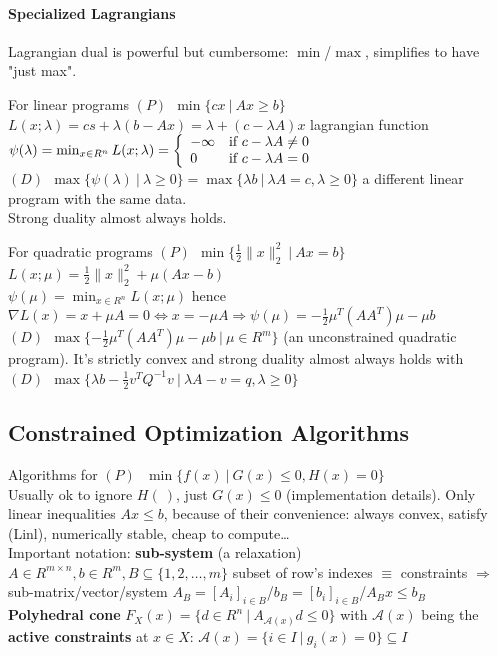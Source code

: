 \documentclass[10pt]{report}
\begin{document}
\paragraph{Specialized Lagrangians} Lagrangian dual is powerful but cumbersome: $\min$/$\max$, simplifies to have "just max".\begin{list}{}{}
	\item For linear programs $(P)\:\:\min\{cx\:|\:Ax\geq b\}$\\
	$L(x;\lambda) = cs + \lambda(b-Ax)=\lambda +(c-\lambda A)x$ lagrangian function\\
	$\psi(\lambda)=\min_{x\in R^n} L(x;\lambda)=\left\{\begin{array}{l l}
	-\infty& \hbox{if }c-\lambda A\neq 0\\
	0& \hbox{if }c-\lambda A= 0\\
	\end{array}\right.$\\
	$(D)\:\:\max\{\psi(\lambda)\:|\:\lambda\geq 0\}=\max\{\lambda b\:|\:\lambda A=c, \lambda\geq 0\}$ a different linear program with the same data.\\
	Strong duality almost always holds.
	\item For quadratic programs $(P)\:\:\min\{\frac{1}{2}\|x\|_2^2\:|\:Ax = b\}$\\
	 $L(x;\mu)=\frac{1}{2}\|x\|_2^2+\mu(Ax-b)$\\
	 $\psi(\mu)=\min_{x\in R^n} L(x;\mu)$ hence $\nabla L(x)=x+\mu A = 0 \Leftrightarrow x = - \mu A\Rightarrow \psi(\mu)=-\frac{1}{2}\mu^T(AA^T)\mu - \mu b$\\
	 $(D)\:\:\max\{-\frac{1}{2}\mu^T(AA^T)\mu-\mu b\:|\:\mu \in R^m\}$ (an unconstrained quadratic program). It's strictly convex and strong duality almost always holds with $(D)\:\:\max\{\lambda b-\frac{1}{2}v^TQ^{-1}v\:|\:\lambda A-v=q, \lambda\geq 0\}$
\end{list}
\subsection{Constrained Optimization Algorithms} Algorithms for $(P)\:\:\:\min\{f(x)\:|\:G(x)\leq 0, H(x) = 0\}$\\
Usually ok to ignore $H(\:)$, just $G(x)\leq 0$ (implementation details). Only linear inequalities $Ax\leq b$, because of their convenience: always convex, satisfy (Linl), numerically stable, cheap to compute\ldots\\
Important notation: \textbf{sub-system} (a relaxation) $A\in R^{m\times n}, b\in R^m, B\subseteq\{1,2,\ldots,m\}$ subset of row's indexes $\equiv$ constraints $\Rightarrow$ sub-matrix/vector/system $A_B=[A_i]_{i\in B}$/$b_B=[b_i]_{i\in B}$/$A_Bx \leq b_B$\\
\textbf{Polyhedral cone} $F_X(x)=\{d\in R^n\:|\:A_{\mathscr{A}(x)} d\leq 0\}$ with $\mathscr{A}(x)$ being the 
\textbf{active constraints} at $x\in X$: $\mathscr{A}(x) = \{i\in I\:|\:g_i(x)=0\}\subseteq I$
\end{document}
